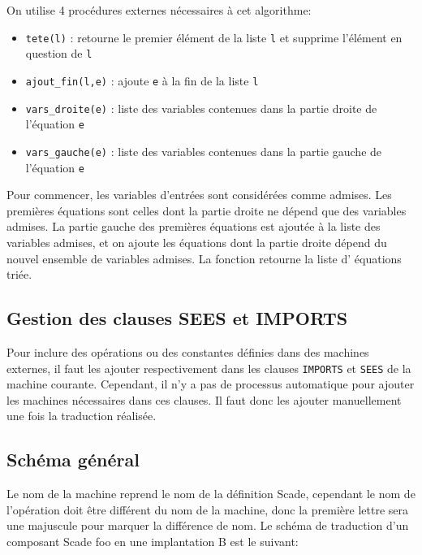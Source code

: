 On utilise 4 procédures externes nécessaires à cet algorithme:
\begin{itemize}
\item \texttt{tete(l)} : retourne le premier élément de la liste \texttt{l} et supprime l'élément
  en question de \texttt{l}
\item \texttt{ajout\_fin(l,e)} : ajoute \texttt{e} à la fin de la liste \texttt{l}
\item \texttt{vars\_droite(e)} : liste des variables contenues dans la partie droite de
  l'équation \texttt{e}
\item \texttt{vars\_gauche(e)} : liste des variables contenues dans la partie gauche de
  l'équation \texttt{e}
\end{itemize}
Pour commencer, les variables d'entrées sont considérées comme admises. Les
premières équations sont celles dont la partie droite ne dépend que des
variables admises. La partie gauche des premières équations est ajoutée à la
liste des variables admises, et on ajoute les équations dont la partie droite
dépend du nouvel ensemble de variables admises. La fonction retourne la liste d'
équations triée.


\subsection{Gestion des clauses SEES et IMPORTS}
Pour inclure des opérations ou des constantes définies dans des machines
externes, il faut les ajouter respectivement dans les clauses \texttt{IMPORTS} et \texttt{SEES} de
la machine courante. Cependant, il n'y a pas de processus automatique pour
ajouter les machines nécessaires dans ces clauses. Il faut donc les ajouter
manuellement une fois la traduction réalisée.


\subsection{Schéma général}

Le nom de la machine reprend le nom de la
définition Scade, cependant le nom de l'opération doit être différent du nom de
la machine, donc la première lettre sera une majuscule pour marquer la
différence de nom. 
Le schéma de traduction d'un composant Scade foo en une implantation B est
le suivant:


